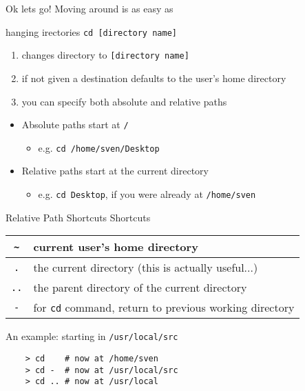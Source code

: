 \begin{frame}[fragile]{Ok lets go!}
  Moving around is as easy as

  \begin{block}{hanging irectories}
    \texttt{cd [directory name]}
    \begin{enumerate}[\--]
      \item changes directory to \texttt{[directory name]}
      \item if not given a destination defaults to the user's home directory
      \item you can specify both absolute and relative paths
    \end{enumerate}
    \vspace*{1em}
  \end{block}

  \begin{itemize}
    \item Absolute paths start at \texttt{/}
    \begin{itemize}
      \item e.g. \texttt{cd /home/sven/Desktop}
    \end{itemize}
    \item Relative paths start at the current directory
    \begin{itemize}
      \item e.g. \texttt{cd Desktop}, if you were already at \texttt{/home/sven}
    \end{itemize}
  \end{itemize}
\end{frame}

\begin{frame}[fragile]{Relative Path Shortcuts}
  Shortcuts

  \begin{tabular}{|c|l|}
    \hline
    \texttt{\textasciitilde} & current user's home directory\\ \hline
    \texttt{.} & the current directory (this is actually useful...)\\ \hline
    \texttt{..} & the parent directory of the current directory\\ \hline
    \texttt{-} & for \texttt{cd} command, return to previous working directory\\ \hline
  \end{tabular}

  An example: starting in \texttt{/usr/local/src}

  \begin{verbatim}
    > cd    # now at /home/sven
    > cd -  # now at /usr/local/src
    > cd .. # now at /usr/local
  \end{verbatim}

\end{frame}
%

